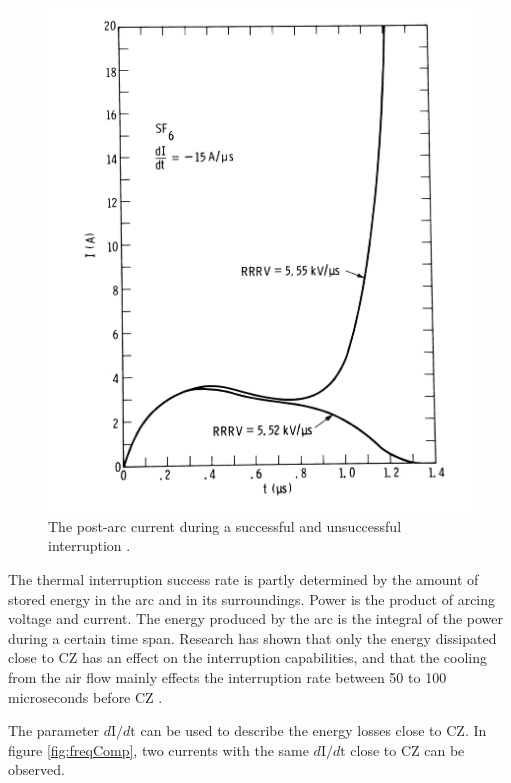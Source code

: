 \documentclass[10pt,b5paper,twoside]{article}
\begin{document}
\begin{figure} [H]
\centering
\includegraphics[scale=0.7]{Bilder/Theory/failSuccPAC.png}
\caption{The post-arc current during a successful and unsuccessful interruption \cite{bib:CIHVN}.} \label{fig:PACbreakandreIgnite}
\end{figure}

The thermal interruption success rate is partly determined by the amount of stored energy in the arc and in its surroundings. Power is the product of arcing voltage and current. The energy produced by the arc is the integral of the power during a certain time span. Research has shown that only the energy dissipated close to CZ has an effect on the interruption capabilities, and that the cooling from the air flow mainly effects the interruption rate between 50 to 100 microseconds before CZ \cite{bib:CIHVN}.

The parameter $d \mathrm{I}/d \mathrm{t}$ can be used to describe the energy losses close to CZ. In figure \ref{fig:freqComp}, two currents with the same $d \mathrm{I}/d \mathrm{t}$ close to CZ can be observed.
\end{document}
